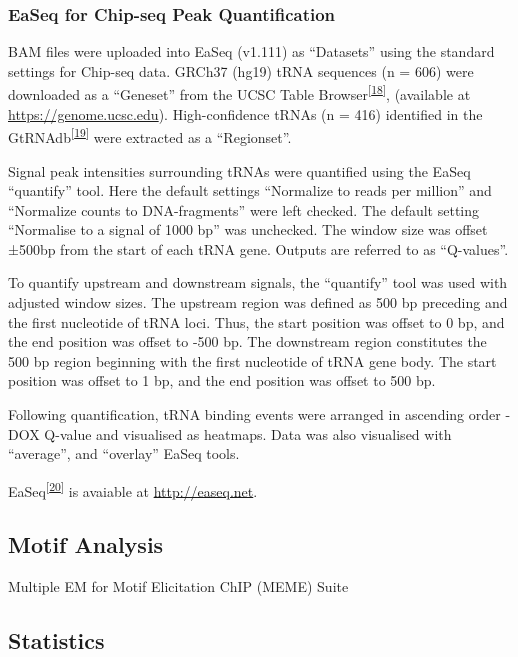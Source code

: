 \documentclass[
  12pt,
]{article}
\begin{document}
\hypertarget{easeq-for-chip-seq-peak-quantification}{%
\subsubsection{EaSeq for Chip-seq Peak Quantification}\label{easeq-for-chip-seq-peak-quantification}}

BAM files were uploaded into EaSeq (v1.111) as ``Datasets'' using the standard settings for Chip-seq data.
GRCh37 (hg19) tRNA sequences (n = 606) were downloaded as a ``Geneset'' from the UCSC Table Browser\textsuperscript{{[}\protect\hyperlink{ref-Karolchik2004}{18}{]}}, (available at \url{https://genome.ucsc.edu}).
High-confidence tRNAs (n = 416) identified in the GtRNAdb\textsuperscript{{[}\protect\hyperlink{ref-Chan2016}{19}{]}} were extracted as a ``Regionset''.

Signal peak intensities surrounding tRNAs were quantified using the EaSeq ``quantify'' tool.
Here the default settings ``Normalize to reads per million'' and ``Normalize counts to DNA-fragments'' were left checked.
The default setting ``Normalise to a signal of 1000 bp'' was unchecked.
The window size was offset ±500bp from the start of each tRNA gene.
Outputs are referred to as ``Q-values''.

To quantify upstream and downstream signals, the ``quantify'' tool was used with adjusted window sizes.
The upstream region was defined as 500 bp preceding and the first nucleotide of tRNA loci.
Thus, the start position was offset to 0 bp, and the end position was offset to -500 bp.
The downstream region constitutes the 500 bp region beginning with the first nucleotide of tRNA gene body.
The start position was offset to 1 bp, and the end position was offset to 500 bp.

Following quantification, tRNA binding events were arranged in ascending order -DOX Q-value and visualised as heatmaps.
Data was also visualised with ``average'', and ``overlay'' EaSeq tools.

EaSeq\textsuperscript{{[}\protect\hyperlink{ref-lerdrup2016}{20}{]}} is avaiable at \url{http://easeq.net}.

\hypertarget{motif-analysis}{%
\subsection{Motif Analysis}\label{motif-analysis}}

Multiple EM for Motif Elicitation ChIP (MEME) Suite

\hypertarget{statistics}{%
\subsection{Statistics}\label{statistics}}
\end{document}
